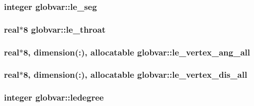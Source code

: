 \subsubsection[{le\+\_\+seg}]{\setlength{\rightskip}{0pt plus 5cm}integer globvar\+::le\+\_\+seg}\label{namespaceglobvar_af945ae82373f900b43e4b1cad0b4c634}
\hypertarget{namespaceglobvar_ae2d9b98958aa2b453bdcb189a5b8b140}{}
\subsubsection[{le\+\_\+throat}]{\setlength{\rightskip}{0pt plus 5cm}real$\ast$8 globvar\+::le\+\_\+throat}\label{namespaceglobvar_ae2d9b98958aa2b453bdcb189a5b8b140}
\hypertarget{namespaceglobvar_a7d4d625f7e3e19483e2e9c240a928d2e}{}
\subsubsection[{le\+\_\+vertex\+\_\+ang\+\_\+all}]{\setlength{\rightskip}{0pt plus 5cm}real$\ast$8, dimension(\+:), allocatable globvar\+::le\+\_\+vertex\+\_\+ang\+\_\+all}\label{namespaceglobvar_a7d4d625f7e3e19483e2e9c240a928d2e}
\hypertarget{namespaceglobvar_a21aa33a09bc33a7e6c7fcb16ca4b9ecf}{}
\subsubsection[{le\+\_\+vertex\+\_\+dis\+\_\+all}]{\setlength{\rightskip}{0pt plus 5cm}real$\ast$8, dimension(\+:), allocatable globvar\+::le\+\_\+vertex\+\_\+dis\+\_\+all}\label{namespaceglobvar_a21aa33a09bc33a7e6c7fcb16ca4b9ecf}
\hypertarget{namespaceglobvar_ab47e00ad68c86a9aac86e082da7398f1}{}
\subsubsection[{ledegree}]{\setlength{\rightskip}{0pt plus 5cm}integer globvar\+::ledegree}\label{namespaceglobvar_ab47e00ad68c86a9aac86e082da7398f1}
\hypertarget{namespaceglobvar_a00121cf01b80ef938df02e8b6a38231c}{}

